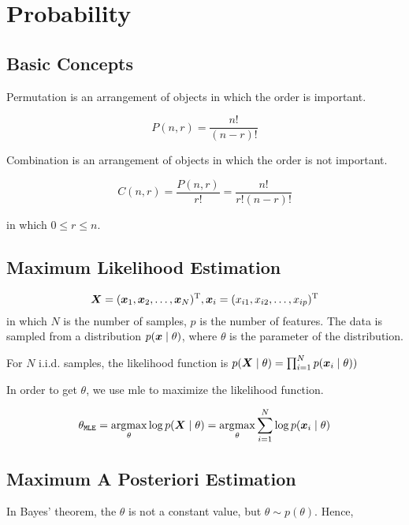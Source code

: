 \chapter{Probability}\label{chp:Probability}
\minitoc

\section{Basic Concepts}


Permutation is an arrangement of objects in which the order is important.

\[
	P\left(n,r\right)=  \frac{n!}{\left(n-r\right)!}
\]

Combination is an arrangement of objects in which the order is not important.


\[
	C\left(n,r\right) = \frac{P\left(n,r\right)}{r!} = \frac{n!}{r!\left(n-r\right)!}
\]


in which \(0 \le r \le n\).


\section{Maximum Likelihood Estimation}

\begin{equation}
	\vX = (\vx_1, \vx_2, \dots, \vx_N)\transp, \vx_i = (x_{i1}, x_{i2},\dots, x_{ip})\transp
\end{equation}
in which $N$ is the number of samples, $p$ is the number of features.
The data is sampled from a distribution $p\giventhat{\vx}{\theta}$, where $\theta$ is the parameter of the distribution.


For \(N\)  i.i.d. samples, the likelihood function is \(p \giventhat{\vX}{\theta} = \prod_{i=1}^{N} p \giventhat{\vx_i}{\theta}) \)

In order to get \(\theta\), we use \gls{mle}  to maximize the likelihood function.

\begin{equation}
	\theta_{\mathtt{MLE}} = \argmax_{\theta} \log p\giventhat{\vX}{\theta} = \argmax_{\theta} \sum_{i=1}^{N} \log p\giventhat{\vx_i}{\theta}
\end{equation}

\section{Maximum A Posteriori Estimation}
In Bayes' theorem, the \(\theta\) is not a constant value, but \(\theta \sim  p(\theta) \).
Hence,

